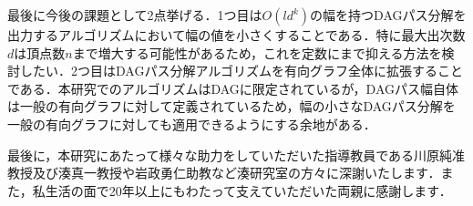 \documentclass[master]{kuisthesis}		%
\theoremstyle{plain}
\theoremstyle{definition}
\begin{document}
最後に今後の課題として2点挙げる．1つ目は$O(ld^k)$の幅を持つDAGパス分解を出力するアルゴリズムにおいて幅の値を小さくすることである．特に最大出次数$d$は頂点数$n$まで増大する可能性があるため，これを定数にまで抑える方法を検討したい．2つ目はDAGパス分解アルゴリズムを有向グラフ全体に拡張することである．本研究でのアルゴリズムはDAGに限定されているが，DAGパス幅自体は一般の有向グラフに対して定義されているため，幅の小さなDAGパス分解を一般の有向グラフに対しても適用できるようにする余地がある．
















\acknowledgments				%
最後に，本研究にあたって様々な助力をしていただいた指導教員である川原純准教授及び湊真一教授や岩政勇仁助教など湊研究室の方々に深謝いたします．また，私生活の面で20年以上にもわたって支えていただいた両親に感謝します．

\nocite{*}
\end{document}
